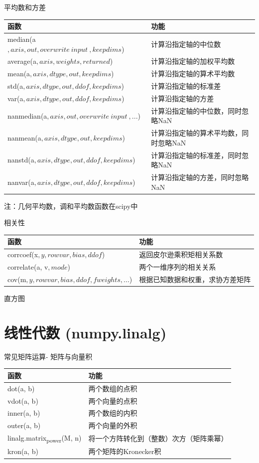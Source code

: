 \documentclass[ignorenonframetext,11pt,xcolor=dvipsnames,hyperref={colorlinks,allcolors=.,urlcolor=blue, citecolor=violet, bookmarksdepth=4},aspectratio=1610]{beamer}
\begin{document}
\begin{frame}{平均数和方差}
\protect\hypertarget{section-28}{}

\begin{longtable}[]{@{}ll@{}}
\toprule
函数 & 功能\tabularnewline
\midrule
\endhead
median(a\(, axis, out, overwrite~input~, keepdims\)) &
计算沿指定轴的中位数\tabularnewline
average(a\(, axis, weights, returned\)) &
计算沿指定轴的加权平均数\tabularnewline
mean(a\(, axis, dtype, out, keepdims\)) &
计算沿指定轴的算术平均数\tabularnewline
std(a\(, axis, dtype, out, ddof, keepdims\)) &
计算沿指定轴的标准差\tabularnewline
var(a\(, axis, dtype, out, ddof, keepdims\)) &
计算沿指定轴的方差\tabularnewline
nanmedian(a\(, axis, out, overwrite~input~, ...\)) &
计算沿指定轴的中位数，同时忽略NaN\tabularnewline
nanmean(a\(, axis, dtype, out, keepdims\)) &
计算沿指定轴的算术平均数，同时忽略NaN\tabularnewline
nanstd(a\(, axis, dtype, out, ddof, keepdims\)) &
计算沿指定轴的标准差，同时忽略NaN\tabularnewline
nanvar(a\(, axis, dtype, out, ddof, keepdims\)) &
计算沿指定轴的方差，同时忽略NaN\tabularnewline
\bottomrule
\end{longtable}

注：几何平均数，调和平均数函数在scipy中

\end{frame}

\begin{frame}{相关性}
\protect\hypertarget{section-29}{}

\begin{longtable}[]{@{}ll@{}}
\toprule
函数 & 功能\tabularnewline
\midrule
\endhead
corrcoef(x\(, y, rowvar, bias, ddof\)) &
返回皮尔逊乘积矩相关系数\tabularnewline
correlate(a, v\(, mode\)) & 两个一维序列的相关关系\tabularnewline
cov(m\(, y, rowvar, bias, ddof, fweights, ...\)) &
根据已知数据和权重，求协方差矩阵\tabularnewline
\bottomrule
\end{longtable}

\end{frame}

\begin{frame}{直方图}
\protect\hypertarget{section-30}{}

\end{frame}

\hypertarget{numpy.linalg}{%
\section{线性代数 (numpy.linalg)}\label{numpy.linalg}}

\begin{frame}{常见矩阵运算- 矩阵与向量积}
\protect\hypertarget{section-31}{}

\begin{longtable}[]{@{}ll@{}}
\toprule
函数 & 功能\tabularnewline
\midrule
\endhead
dot(a, b) & 两个数组的点积\tabularnewline
vdot(a, b) & 两个向量的点积\tabularnewline
inner(a, b) & 两个数组的内积\tabularnewline
outer(a, b) & 两个向量的外积\tabularnewline
linalg.matrix\textsubscript{power}(M, n) &
将一个方阵转化到（整数）次方（矩阵乘幂）\tabularnewline
kron(a, b) & 两个矩阵的Kronecker积\tabularnewline
\bottomrule
\end{longtable}

\end{frame}
\end{document}
